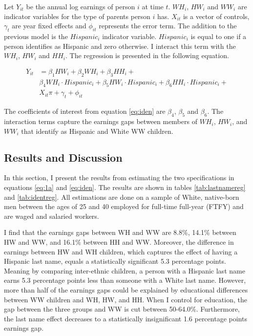 \documentclass[12pt, fullpage]{article}
\begin{document}
Let $Y_{it}$ be the annual log earnings of person $i$ at time $t$. $WH_{i}$, $HW_{i}$ and $WW_{i}$ are indicator variables for the type of parents person $i$ has. $X_{it}$ is a vector of controls, $\gamma_{t}$ are year fixed effects and $\phi_{it}$ represents the error term. The addition to the previous model is the $Hispanic_{i}$ indicator variable. $Hispanic_{i}$ is equal to one if a person identifies as Hispanic and zero otherwise. I interact this term with the $WH_{i}$, $HW_{i}$ and $HH_{i}$.  The regression is presented in the following equation.

\begin{align} \label{eq:iden}
Y_{it} &= \beta_{1} HW_{i} +  \beta_{2} WH_{i} + \beta_{3} HH_{i} +\\
& \beta_{4} WH_{i} \cdot Hispanic_{i} + \beta_{5} HW_{i}\cdot Hispanic_{i} +  \beta_{6} HH_{i} \cdot Hispanic_{i}+ \nonumber \\
&X_{it} \pi + \gamma_{t}+\phi_{it} \nonumber
\end{align}

The coefficients of interest from equation \ref{eq:iden} are $\beta_{4}$, $\beta_{5}$ and $\beta_{6}$. The interaction terms capture the earnings gaps between members of $WH_{i}$, $HW_{i}$, and $WW_{i}$ that identify as Hispanic and White WW children. 

\subsection{Results and Discussion}\label{sec:results}

In this section, I present the results from estimating the two specifications in equations \ref{eq:1a} and \ref{eq:iden}. The results are shown in tables \ref{tab:lastnamereg} and \ref{tab:identreg}. All estimations are done on a sample of White, native-born men between the ages of 25 and 40 employed for full-time full-year (FTFY) and are waged and salaried workers.

I find that the earnings gaps between WH and WW are 8.8\%, 14.1\% between HW and WW, and 16.1\% between HH and WW. Moreover, the difference in earnings between HW and WH children, which captures the effect of having a Hispanic last name, equals a statistically significant 5.3 percentage points. Meaning by comparing inter-ethnic children, a person with a Hispanic last name earns 5.3 percentage points less than someone with a White last name. However, more than half of the earnings gaps could be explained by educational differences between WW children and WH, HW, and HH. When I control for education, the gap between the three groups and WW is cut between 50-64.0\%. Furthermore, the last name effect decreases to a statistically insignificant 1.6 percentage points earnings gap.
\end{document}
